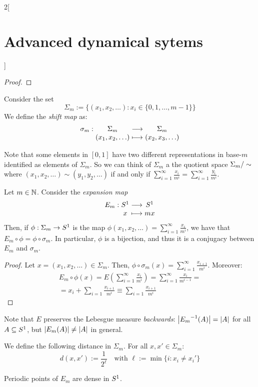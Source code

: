 \documentclass[../../../main_math.tex]{subfiles}
\begin{document}
\begin{multicols}{2}[\section{Advanced dynamical sytems}]
\begin{proof}
  \end{proof}
  \begin{definition}
    Consider the set $$\Sigma_m
      := \{(x_1,x_2,\ldots):x_i\in\{0,1,\ldots,m-1\}\}$$
    We define the \emph{shift map} as:
    $$
      \function{\sigma_m}{\Sigma_m}{\Sigma_m}{(x_1,x_2,\ldots)}{(x_2,x_3,\ldots)}
    $$
  \end{definition}
  \begin{remark}
    Note that some elements in $[0,1]$ have two different representations in base-$m$ identified as elements of $\Sigma_m$. So we can think of $\Sigma_m$ a the quotient space $\quot{\Sigma_m}{\sim}$ where $(x_1,x_2,\ldots)\sim (y_1,y_2,\ldots)$ if and only if $\sum_{i=1}^\infty \frac{x_i}{m^i}=\sum_{i=1}^\infty \frac{y_i}{m^i}$.
  \end{remark}
  \begin{proposition}
    Let $m\in\NN$. Consider the \emph{expansion map}
    $$
      \function{E_m}{\S^1}{\S^1}{x}{mx}
    $$
    Then, if $\phi:\Sigma_m\to \S^1$ is the map $\phi(x_1,x_2,\ldots)=\sum_{i=1}^\infty \frac{x_i}{m^i}$, we have that $E_m\circ \phi=\phi\circ \sigma_m$. In particular, $\phi$ is a bijection, and thus it is a conjugacy between $E_m$ and $\sigma_m$.
  \end{proposition}
  \begin{proof}
    Let $x=(x_1,x_2,\ldots)\in \Sigma_m$. Then, $\phi\circ \sigma_m(x)=\sum_{i=1}^\infty \frac{x_{i+1}}{m^i}$. Moreover:
    \begin{multline*}
      E_m\circ \phi(x)=E\left(\sum_{i=1}^\infty \frac{x_i}{m^i}\right)=\sum_{i=1}^\infty \frac{x_i}{m^{i-1}}=\\=x_i+\sum_{i=1}\frac{x_{i+1}}{m^i}\equiv\sum_{i=1}\frac{x_{i+1}}{m^i}
    \end{multline*}
  \end{proof}
  \begin{remark}
    Note that $E$ preserves the Lebesgue measure \textit{backwards}: $\abs{{E_m}^{-1}(A)}=\abs{A}$ for all $A\subseteq \S^1$, but $\abs{E_m(A)}\ne \abs{A}$ in general.
  \end{remark}
  \begin{definition}
    We define the following distance in $\Sigma_m$. For all $x,x'\in\Sigma_m$:
    $$
      d(x,x'):=\frac{1}{2^\ell}\quad\text{with }\ell:=\min\{i:x_i\ne x_i'\}
    $$
  \end{definition}
  \begin{proposition}
    Periodic points of $E_m$ are dense in $\S^1$.
  \end{proposition}

\end{multicols}
\end{document}
